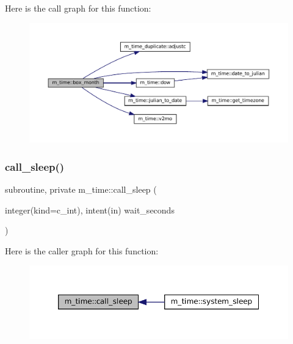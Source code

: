 Here is the call graph for this function\+:\nopagebreak
\begin{figure}[H]
\begin{center}
\leavevmode
\includegraphics[width=350pt]{namespacem__time_a0fe7540912df30d3578f3c469413aea8_cgraph}
\end{center}
\end{figure}
\mbox{\label{namespacem__time_af558bfc1fd5b13a6b879b3969866956f}} 
\subsubsection{\texorpdfstring{call\+\_\+sleep()}{call\_sleep()}}
{\footnotesize\ttfamily subroutine, private m\+\_\+time\+::call\+\_\+sleep (\begin{DoxyParamCaption}\item[{integer(kind=c\+\_\+int), intent(in)}]{wait\+\_\+seconds }\end{DoxyParamCaption})\hspace{0.3cm}{\ttfamily [private]}}

Here is the caller graph for this function\+:\nopagebreak
\begin{figure}[H]
\begin{center}
\leavevmode
\includegraphics[width=350pt]{namespacem__time_af558bfc1fd5b13a6b879b3969866956f_icgraph}
\end{center}
\end{figure}
\mbox{\label{namespacem__time_ae63783f7479d2f5093c8031d38ce4304}} 
